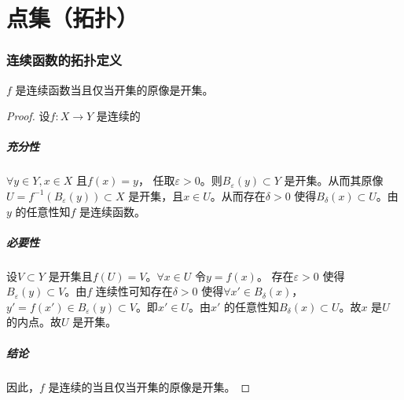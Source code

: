 \chapter{点集（拓扑）}
\subsection{连续函数的拓扑定义}
\begin{definition}
    \(f\) 是连续函数当且仅当开集的原像是开集。
\end{definition}

\begin{proof}
    设\(f: X\to Y\) 是连续的
    \paragraph{充分性}
    \(\forall y \in Y, x \in X\) 且\(f(x)=y\)，
    任取\(\varepsilon >0\)。则\(B_{\varepsilon}(y) \subset Y\)
    是开集。从而其原像\(U=f^{-1}\left( B_{\varepsilon}(y)
    \right)\subset X\) 是开集，且\(x \in U\)。从而存在\(\delta >0\)
    使得\(B_{\delta}(x) \subset U\)。由\(y\) 的任意性知\(f\) 是连续函数。
    \paragraph{必要性}
    设\(V \subset Y\) 是开集且\(f(U)=V\)。\(\forall x \in U\) 令\(y=f(x)\)。
    存在\(\varepsilon >0\) 使得\(B_{\varepsilon}(y) \subset
    V\)。由\(f\) 连续性可知存在\(\delta >0\) 使得\(\forall x' \in
    B_{\delta}(x)\)，\(y'=f(x')\in B_{\varepsilon}(y)
    \subset V\)。即\(x' \in U\)。由\(x'\)
    的任意性知\(B_{\delta}(x) \subset U\)。故\(x\) 是\(U\) 的内点。故\(U\) 是开集。
    \paragraph{结论}
    因此，\(f\) 是连续的当且仅当开集的原像是开集。
\end{proof}

